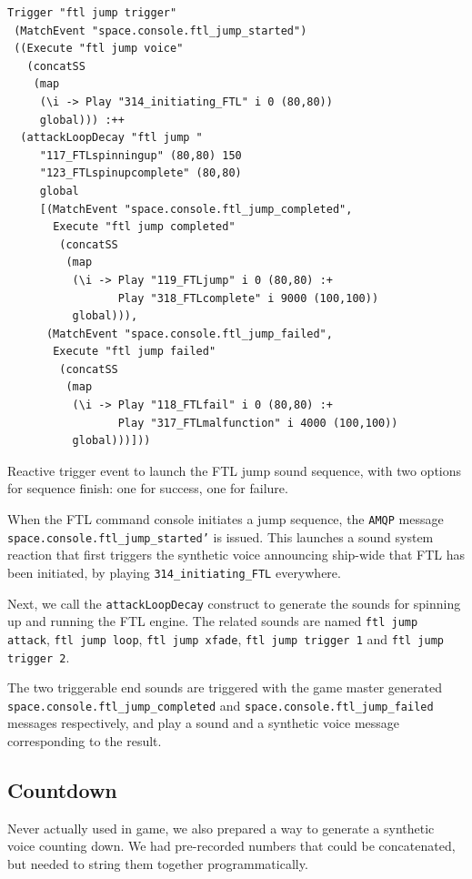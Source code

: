 \begin{listing}
\begin{verbatim}
Trigger "ftl jump trigger" 
 (MatchEvent "space.console.ftl_jump_started") 
 ((Execute "ftl jump voice" 
   (concatSS 
    (map 
     (\i -> Play "314_initiating_FTL" i 0 (80,80)) 
     global))) :++ 
  (attackLoopDecay "ftl jump " 
     "117_FTLspinningup" (80,80) 150 
     "123_FTLspinupcomplete" (80,80) 
     global 
     [(MatchEvent "space.console.ftl_jump_completed", 
       Execute "ftl jump completed" 
        (concatSS 
         (map 
          (\i -> Play "119_FTLjump" i 0 (80,80) :+ 
                 Play "318_FTLcomplete" i 9000 (100,100)) 
          global))),
      (MatchEvent "space.console.ftl_jump_failed", 
       Execute "ftl jump failed" 
        (concatSS 
         (map 
          (\i -> Play "118_FTLfail" i 0 (80,80) :+ 
                 Play "317_FTLmalfunction" i 4000 (100,100)) 
          global)))]))
\end{verbatim}
\caption{Reactive trigger event to launch the FTL jump sound sequence,
with two options for sequence finish: one for success, one for failure.}
\end{listing}

When the FTL command console initiates a jump sequence, the
\texttt{AMQP} message \texttt{space.console.ftl\_jump\_started'} is
issued. This launches a sound system reaction that first triggers the
synthetic voice announcing ship-wide that FTL has been initiated, by
playing \texttt{314\_initiating\_FTL} everywhere.

Next, we call the \texttt{attackLoopDecay} construct to generate the
sounds for spinning up and running the FTL engine. The related sounds
are named \texttt{ftl jump attack}, \texttt{ftl jump loop},
\texttt{ftl jump xfade}, \texttt{ftl jump trigger 1}  and \texttt{ftl
  jump trigger 2}.

The two triggerable end sounds are triggered with the game master
generated \texttt{space.console.ftl\_jump\_completed} and
\texttt{space.console.ftl\_jump\_failed} messages respectively, and
play a sound and a synthetic voice message corresponding to the result.

\subsection{Countdown}
\label{sec:countdown}

Never actually used in game, we also prepared a way to generate a
synthetic voice counting down. We had pre-recorded numbers that could
be concatenated, but needed to string them together programmatically.

